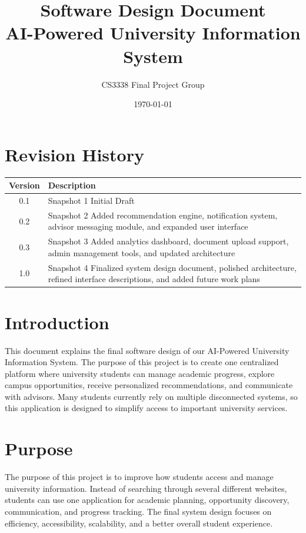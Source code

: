 \documentclass[12pt]{article}
\title{Software Design Document \\ AI-Powered University Information System}
\author{CS3338 Final Project Group}
\date{\today}
\begin{document}
\maketitle

\section{Revision History}

\begin{center}
\begin{tabular}{|c|p{4in}|}
\hline
Version & Description \\
\hline
0.1 & Snapshot 1 Initial Draft \\
\hline
0.2 & Snapshot 2 Added recommendation engine, notification system, advisor messaging module, and expanded user interface \\
\hline
0.3 & Snapshot 3 Added analytics dashboard, document upload support, admin management tools, and updated architecture \\
\hline
1.0 & Snapshot 4 Finalized system design document, polished architecture, refined interface descriptions, and added future work plans \\
\hline
\end{tabular}
\end{center}

\section{Introduction}

This document explains the final software design of our AI-Powered University Information System.
The purpose of this project is to create one centralized platform where university students can manage academic progress, explore campus opportunities, receive personalized recommendations, and communicate with advisors.
Many students currently rely on multiple disconnected systems, so this application is designed to simplify access to important university services.

\section{Purpose}

The purpose of this project is to improve how students access and manage university information.
Instead of searching through several different websites, students can use one application for academic planning, opportunity discovery, communication, and progress tracking.
The final system design focuses on efficiency, accessibility, scalability, and a better overall student experience.
\end{document}
